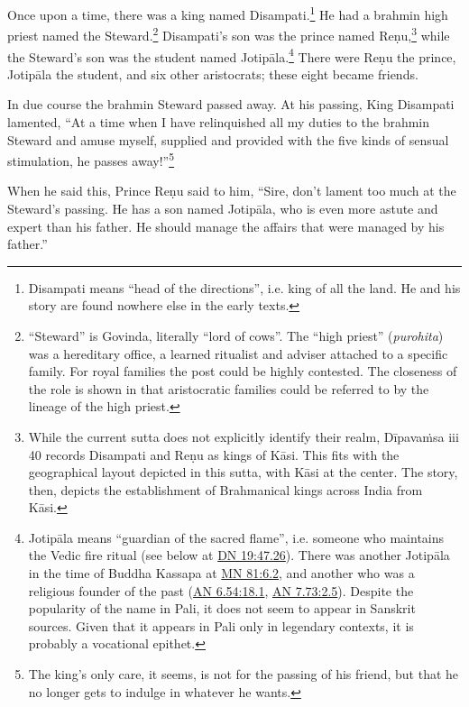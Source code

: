 \documentclass[12pt,openany]{book}%
\begin{document}
Once upon a time, there was a king named Disampati.\footnote{Disampati means “head of the directions”, i.e. king of all the land. He and his story are found nowhere else in the early texts. } He had a brahmin high priest named the Steward.\footnote{“Steward” is Govinda, literally “lord of cows”. The “high priest” (\textit{purohita}) was a hereditary office, a learned ritualist and adviser attached to a specific family. For royal families the post could be highly contested. The closeness of the role is shown in that aristocratic families could be referred to by the lineage of the high priest. } Disampati’s son was the prince named \textsanskrit{Reṇu},\footnote{While the current sutta does not explicitly identify their realm, \textsanskrit{Dīpavaṁsa} iii 40 records Disampati and \textsanskrit{Reṇu} as kings of \textsanskrit{Kāsi}. This fits with the geographical layout depicted in this sutta, with \textsanskrit{Kāsi} at the center. The story, then, depicts the establishment of Brahmanical kings across India from \textsanskrit{Kāsi}. } while the Steward’s son was the student named \textsanskrit{Jotipāla}.\footnote{\textsanskrit{Jotipāla} means “guardian of the sacred flame”, i.e. someone who maintains the Vedic fire ritual (see below at \href{https://suttacentral.net/dn19/en/sujato\#47.26}{DN 19:47.26}). There was another \textsanskrit{Jotipāla} in the time of Buddha Kassapa at \href{https://suttacentral.net/mn81/en/sujato\#6.2}{MN 81:6.2}, and another who was a religious founder of the past (\href{https://suttacentral.net/an6.54/en/sujato\#18.1}{AN 6.54:18.1}, \href{https://suttacentral.net/an7.73/en/sujato\#2.5}{AN 7.73:2.5}). Despite the popularity of the name in Pali, it does not seem to appear in Sanskrit sources. Given that it appears in Pali only in legendary contexts, it is probably a vocational epithet. } There were \textsanskrit{Reṇu} the prince, \textsanskrit{Jotipāla} the student, and six other aristocrats; these eight became friends. 

In due course the brahmin Steward passed away. At his passing, King Disampati lamented, “At a time when I have relinquished all my duties to the brahmin Steward and amuse myself, supplied and provided with the five kinds of sensual stimulation, he passes away!”\footnote{The king’s only care, it seems, is not for the passing of his friend, but that he no longer gets to indulge in whatever he wants. } 

When he said this, Prince \textsanskrit{Reṇu} said to him, “Sire, don’t lament too much at the Steward’s passing. He has a son named \textsanskrit{Jotipāla}, who is even more astute and expert than his father. He should manage the affairs that were managed by his father.” 
\end{document}

